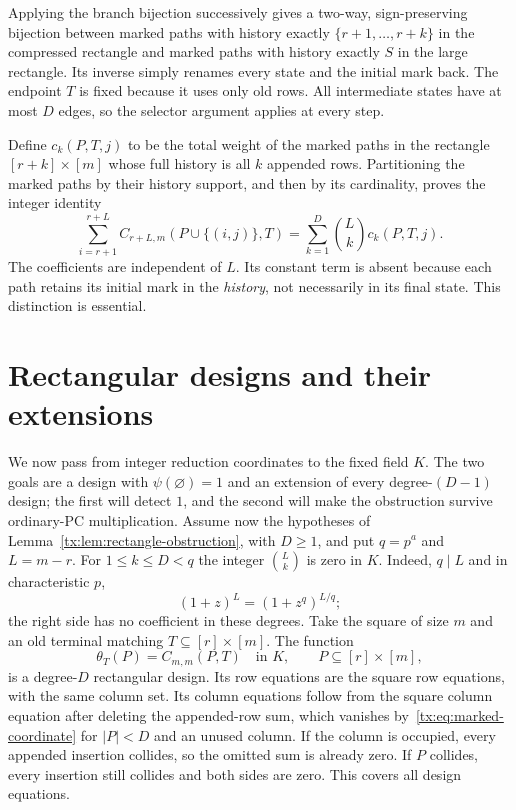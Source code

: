 Applying the branch bijection successively gives a two-way, sign-preserving
bijection between marked paths with history exactly
$\{r+1,\ldots,r+k\}$ in the compressed rectangle and marked paths with
history exactly $S$ in the large rectangle.  Its inverse simply renames
every state and the initial mark back.  The endpoint $T$ is fixed because
it uses only old rows.  All intermediate states have at most $D$ edges,
so the selector argument applies at every step.

Define $c_k(P,T,j)$ to be the total weight of the marked paths in the
rectangle $[r+k]\times[m]$ whose full history is all $k$ appended rows.
Partitioning the marked paths by their history support, and then by its
cardinality, proves the integer identity
\begin{equation}\label{tx:eq:marked-coordinate}
 \sum_{i=r+1}^{r+L}
       C_{r+L,m}(P\cup\{(i,j)\},T)
    =\sum_{k=1}^{D}\binom{L}{k}c_k(P,T,j).
\end{equation}
The coefficients are independent of $L$.  Its constant term is absent
because each path retains its initial mark in the \emph{history}, not
necessarily in its final state.  This distinction is essential.

\section{Rectangular designs and their extensions}

We now pass from integer reduction coordinates to the fixed field $K$.
The two goals are a design with $\psi(\varnothing)=1$ and an extension
of every degree-$(D-1)$ design; the first will detect $1$, and the second
will make the obstruction survive ordinary-PC multiplication.
Assume now the hypotheses of Lemma~\ref{tx:lem:rectangle-obstruction}, with
$D\geq1$, and put $q=p^a$ and $L=m-r$.  For $1\leq k\leq D<q$ the
integer $\binom{L}{k}$ is zero in $K$.  Indeed, $q\mid L$ and in
characteristic $p$,
\[
 (1+z)^L=(1+z^q)^{L/q};
\]
the right side has no coefficient in these degrees.  Take the square
of size $m$ and an old terminal matching $T\subseteq[r]\times[m]$.
The function
\[
 \theta_T(P)=C_{m,m}(P,T)\quad\text{in }K,
       \qquad P\subseteq[r]\times[m],
\]
is a degree-$D$ rectangular design.  Its row equations are the square
row equations, with the same column set.  Its column equations follow
from the square column equation after deleting the appended-row sum,
which vanishes by~\eqref{tx:eq:marked-coordinate} for $|P|<D$ and an
unused column.  If the column is occupied, every appended insertion
collides, so the omitted sum is already zero.  If $P$ collides, every
insertion still collides and both sides are zero.  This covers all
design equations.

